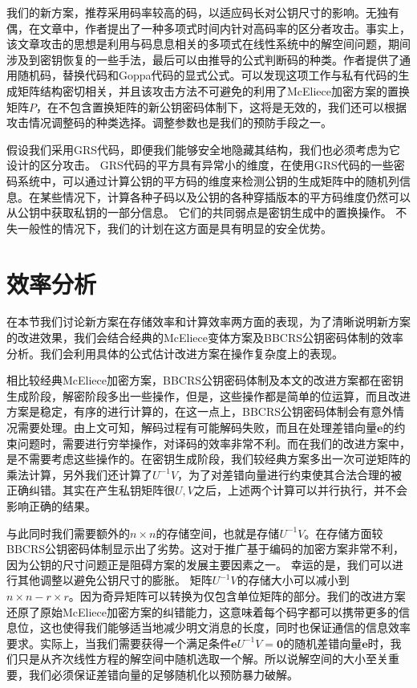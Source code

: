 我们的新方案，推荐采用码率较高的码，以适应码长对公钥尺寸的影响。无独有偶，在文章中，作者提出了一种多项式时间内针对高码率的区分者攻击。事实上，该文章攻击的思想是利用与码息息相关的多项式在线性系统中的解空间问题，期间涉及到密钥恢复的一些手法，最后可以由推导的公式判断码的种类。作者提供了通用随机码，替换代码和Goppa代码的显式公式。可以发现这项工作与私有代码的生成矩阵结构密切相关，并且该攻击方法不可避免的利用了McEliece加密方案的置换矩阵$P$，在不包含置换矩阵的新公钥密码体制下，这将是无效的，我们还可以根据攻击情况调整码的种类选择。调整参数也是我们的预防手段之一。

假设我们采用GRS代码，即便我们能够安全地隐藏其结构，我们也必须考虑为它设计的区分攻击。 GRS代码的平方具有异常小的维度，在使用GRS代码的一些密码系统中，可以通过计算公钥的平方码的维度来检测公钥的生成矩阵中的随机列信息。在某些情况下，计算各种子码以及公钥的各种穿插版本的平方码维度仍然可以从公钥中获取私钥的一部分信息。 它们的共同弱点是密钥生成中的置换操作。 不失一般性的情况下，我们的计划在这方面是具有明显的安全优势。

\section{效率分析}
在本节我们讨论新方案在存储效率和计算效率两方面的表现，为了清晰说明新方案的改进效果，我们会结合经典的McEliece变体方案及BBCRS公钥密码体制的效率分析。我们会利用具体的公式估计改进方案在操作复杂度上的表现。

相比较经典McEliece加密方案，BBCRS公钥密码体制及本文的改进方案都在密钥生成阶段，解密阶段多出一些操作，但是，这些操作都是简单的位运算，而且改进方案是稳定，有序的进行计算的，在这一点上，BBCRS公钥密码体制会有意外情况需要处理。由上文可知，解码过程有可能解码失败，而且在处理差错向量$\mathbf{e}$的约束问题时，需要进行穷举操作，对译码的效率非常不利。而在我们的改进方案中，是不需要考虑这些操作的。在密钥生成阶段，我们较经典方案多出一次可逆矩阵的乘法计算，另外我们还计算了$U^{-1}V$，为了对差错向量进行约束使其合法合理的被正确纠错。其实在产生私钥矩阵很$U,V$之后，上述两个计算可以并行执行，并不会影响正确的结果。

与此同时我们需要额外的$n \times n$的存储空间，也就是存储$U^{-1}V$。在存储方面较BBCRS公钥密码体制显示出了劣势。这对于推广基于编码的加密方案非常不利，因为公钥的尺寸问题正是阻碍方案的发展主要因素之一。 幸运的是，我们可以进行其他调整以避免公钥尺寸的膨胀。 矩阵$U^{-1}V$的存储大小可以减小到$n \times n - r \times r$。因为奇异矩阵可以转换为仅包含单位矩阵的部分。我们的改进方案还原了原始McEliece加密方案的纠错能力，这意味着每个码字都可以携带更多的信息位，这也使得我们能够适当地减少明文消息的长度，同时也保证通信的信息效率要求。实际上，当我们需要获得一个满足条件$\mathbf{e}U^{-1}V = \mathbf{0}$的随机差错向量$\mathbf{e}$时，我们只是从齐次线性方程的解空间中随机选取一个解。所以说解空间的大小至关重要，我们必须保证差错向量的足够随机化以预防暴力破解。

